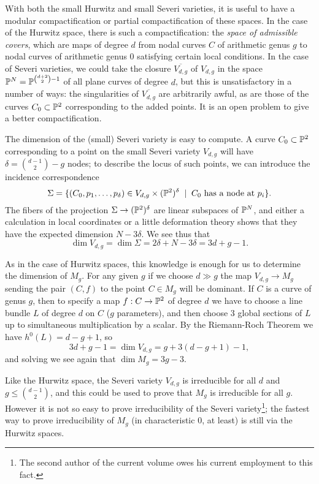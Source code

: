 With both the small Hurwitz and small Severi varieties, it is useful to have a modular compactification or partial compactification of these spaces. In the case of the Hurwitz space, there is such a compactification: the \emph{space of admissible covers}, which are  maps of degree $d$ from nodal curves $C$ of arithmetic genus $g$ to nodal curves of arithmetic genus 0 satisfying certain local conditions. In the case of Severi varieties, we could take the closure $\overline{V_{d,g}}$ of $V_{d,g}$ in the space $\PP^N = \PP^{\binom{d+2}{2}-1}$ of all plane curves of degree $d$, but this is unsatisfactory in a number of ways: the singularities of $\overline{V_{d,g}}$ are arbitrarily awful, as are those of the curves $C_0 \subset \PP^2$ corresponding to the added points. It is an open problem to give a better compactification.


The dimension of the (small) Severi variety is easy to compute. A curve $C_0 \subset \PP^2$ corresponding to a point on the small Severi variety $V_{d,g}$ will have $\delta = \binom{d-1}{2} - g$ nodes; to describe the locus of such points, we can introduce the incidence correspondence
$$
\Sigma = \{(C_0,p_1,\dots,p_\delta) \in V_{d,g} \times (\PP^2)^\delta \; \mid \; C_0 \text{ has a node at $p_i$} \}.
$$
The fibers of the projection $\Sigma \to (\PP^2)^\delta$ are linear subspaces of $\PP^N$, and either a calculation in local coordinates or a little deformation theory shows that they have the expected dimension $N - 3\delta$. We see thus that
$$
\dim V_{d,g} = \dim \Sigma = 2\delta + N - 3\delta = 3d+g-1.
$$


As in the case of Hurwitz spaces, this knowledge is enough for us to determine the dimension of $M_g$. For any given $g$ if we choose $d \gg g$ the map $V_{d,g} \to M_g$ sending the pair $(C, f)$ to the point $C \in M_g$ will be dominant. If $C$ is a curve of genus $g$, then  to specify a map $f : C \to \PP^2$ of degree $d$ we have to choose a line bundle $L$ of degree $d$ on $C$ ($g$ parameters), and then choose 3 global sections of $L$ up to simultaneous multiplication by a scalar. By the Riemann-Roch Theorem we have $h^0(L) = d-g+1$, so
$$
3d+g-1 = \dim V_{d,g}  = g + 3(d-g+1) - 1,
$$
and solving we see again that $\dim M_g = 3g-3$.

Like the Hurwitz space, the Severi variety $V_{d,g}$ is irreducible for all $d$ and $g\leq \binom{d-1}{2}$, and this could be used to prove that $M_g$ is irreducible for all $g$. However it is not so easy to prove irreducibility of the Severi variety\footnote{The second author of the current volume owes his current employment to this fact.}; the fastest way to prove irreducibility of $M_g$ (in characteristic 0, at least) is still via the Hurwitz spaces.

